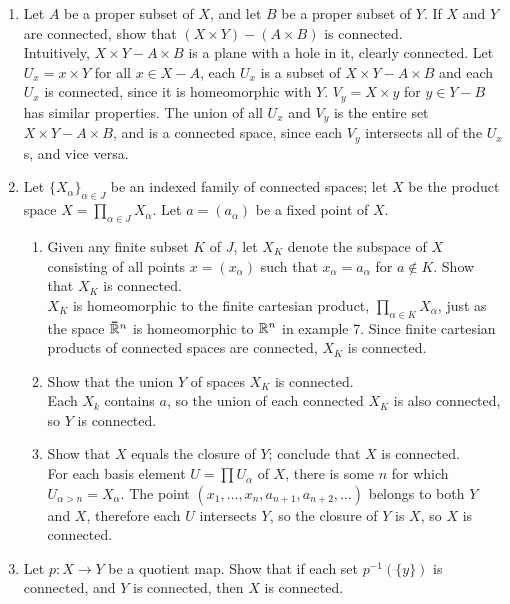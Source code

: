 \documentclass[12pt,letterpaper]{article}
\begin{document}
\begin{enumerate}
  \item Let $A$ be a proper subset of $X$, and let $B$ be a proper subset of $Y$. If $X$ and $Y$ are connected, show that $(X\times Y) - (A\times B)$ is connected. \\
  Intuitively, $X\times Y - A\times B$ is a plane with a hole in it, clearly connected. %
  Let $U_x=x\times Y$ for all $x\in X-A$, each $U_x$ is a subset of $X\times Y - A\times B$ and each $U_x$ is connected, since it is homeomorphic with $Y$. $V_y=X\times y$ for $y\in Y-B$ has similar properties. The union of all $U_x$ and $V_y$ is the entire set $X\times Y-A\times B$, and is a connected space, since each $V_y$ intersects all of the $U_x$s, and vice versa. 
  \item Let $\{X_\alpha\}_{\alpha\in J}$ be an indexed family of connected spaces; let $X$ be the product space $X=\prod_{\alpha\in J}X_\alpha$. Let $a=(a_\alpha)$ be a fixed point of $X$.
  \begin{enumerate}
    \item Given any finite subset $K$ of $J$, let $X_K$ denote the subspace of $X$ consisting of all points $x=(x_\alpha)$ such that $x_\alpha=a_\alpha$ for $a\not\in K$. Show that $X_K$ is connected. \\
    $X_K$ is homeomorphic to the finite cartesian product, $\prod_{\alpha\in K}X_\alpha$, just as the space $\bar{\R}^n$ is homeomorphic to $\mathbb{R}^n$ in example 7. Since finite cartesian products of connected spaces are connected, $X_K$ is connected.
    \item Show that the union $Y$ of spaces $X_K$ is connected. \\
    Each $X_k$ contains $a$, so the union of each connected $X_K$ is also connected, so $Y$ is connected.
    \item Show that $X$ equals the closure of $Y$; conclude that $X$ is connected.\\
    For each basis element $U=\prod U_\alpha$ of $X$, there is some $n$ for which $U_{\alpha>n}=X_\alpha$. The point $(x_1,\dots,x_n,a_{n+1},a_{n+2},\dots)$ belongs to both $Y$ and $X$, therefore each $U$ intersects $Y$, so the closure of $Y$ is $X$, so $X$ is connected.
  \end{enumerate}
  \item Let $p:X\rightarrow Y$ be a quotient map. Show that if each set $p^{-1}(\{y\})$ is connected, and $Y$ is connected, then $X$ is connected. \\

\end{enumerate}
\end{document}

